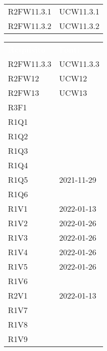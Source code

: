 \begin{table}[H]
\begin{tabular}[t]{ m{}<{\centering}  m{}<{\centering} }
	R2FW11.3.1 & UCW11.3.1 \\
	
	R2FW11.3.2 & UCW11.3.2 \\
	
\end{tabular}
\begin{tabular}[t]{ m{}<{\centering}  m{}<{\centering} }
	\rowcolor{darkblue}
	\textcolor{white}{\textbf{Requisito}} &\textcolor{white}{\textbf{Fonti}}\\ 

	R2FW11.3.3 & UCW11.3.3 \\ 	 	

	R2FW12 & UCW12\\

	R2FW13 & UCW13\\
	
	R3F1 & \Di \\	
	
	R1Q1 & \Di \\
	
	R1Q2 & \Ca \\
	
	R1Q3 & \Ca \\
	
	R1Q4 &  \Ca \\
	
	R1Q5 & \Vi{} 2021-11-29\\

	R1Q6 & \Di \\

	R1V1 & \Vi{} 2022-01-13 \\	

	R1V2 & \Ve{} 2022-01-26 \\	
	 
	R1V3 & \Ve{} 2022-01-26 \\	

	R1V4 & \Ve{} 2022-01-26 \\	
	 
	R1V5 & \Ve{} 2022-01-26 \\	
	 
	R1V6 & \Ca \\	
	 
	R2V1 & \Vi{} 2022-01-13 \\
	
	R1V7 & \Ca \\	
	 
	R1V8 & \Ca \\	 
	
	R1V9 & \Ca \\	
	

\end{tabular}
\end{table}
